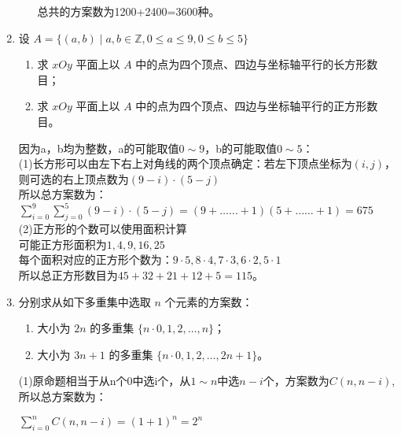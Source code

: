 \documentclass[a4paper]{article}
\begin{document}
\begin{enumerate}
\begin{solution}
\begin{enumerate}
      总共的方案数为1200+2400=3600种。
\end{enumerate}
\end{solution}

\item 设 $A = \{(a,b) \mid a, b \in \mathbb{Z}, 0 \leq a \leq 9, 0 \leq b \leq 5\}$
\begin{enumerate}
      \item 求 $xOy$ 平面上以 $A$ 中的点为四个顶点、四边与坐标轴平行的长方形数目；
      \item 求 $xOy$ 平面上以 $A$ 中的点为四个顶点、四边与坐标轴平行的正方形数目。
\end{enumerate}

\begin{solution}
      \begin{enumerate}
      因为a，b均为整数，a的可能取值$0\sim9$，b的可能取值$0\sim5$：\\
      (1)长方形可以由左下右上对角线的两个顶点确定：若左下顶点坐标为$(i,j)$，则可选的右上顶点数为$(9-i)\cdot (5-j)$\\
      所以总方案数为：$\sum_{i=0}^9\sum_{j=0}^5(9-i)\cdot (5-j)=(9+……+1)(5+……+1)=675$\\
      (2)正方形的个数可以使用面积计算\\可能正方形面积为$1,4,9,16,25$\\
      每个面积对应的正方形个数为：$9\cdot 5,8\cdot 4, 7\cdot 3, 6\cdot 2,5\cdot 1$\\
      所以总正方形数目为$45+32+21+12+5=115$。
\end{enumerate}
\end{solution}

\item 分别求从如下多重集中选取 $n$ 个元素的方案数：
\begin{enumerate}
      \item 大小为 $2n$ 的多重集 $\{n \cdot 0, 1, 2, \dots, n\}$；
      \item 大小为 $3n + 1$ 的多重集 $\{n \cdot 0, 1, 2, \dots, 2n + 1\}$。
\end{enumerate}

\begin{solution}
      \begin{enumerate}
      (1)原命题相当于从n个0中选i个，从$1\sim n$中选$n-i$个，方案数为$C(n,n-i)$,
      所以总方案数为：\\
      \begin{center}
            $\sum_{i=0}^nC(n,n-i)=(1+1)^n=2^n$\\
      \end{center}
      

\end{enumerate}
\end{solution}
\end{enumerate}
\end{document}
